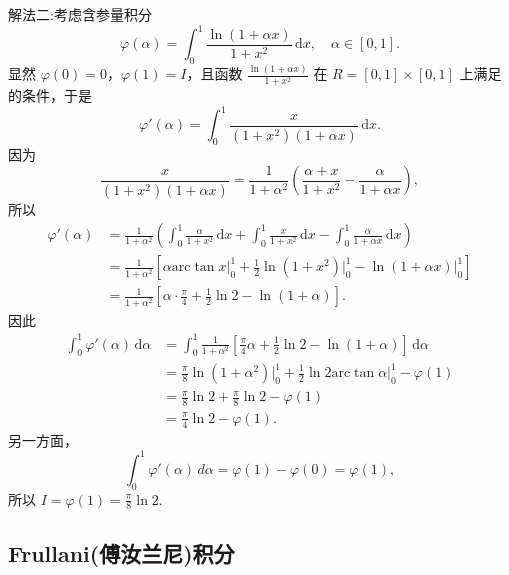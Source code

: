 \documentclass[../../main.tex]{subfiles}
\begin{document}
\begin{solution}
{\color{blue}解法二:}考虑含参量积分
\[
\varphi(\alpha) = \int_{0}^{1} \frac{\ln(1 + \alpha x)}{1 + x^2} \, \mathrm{d}x, \quad \alpha \in [0,1].
\]
显然 \( \varphi(0) = 0 \)，\( \varphi(1) = I \)，且函数 \( \frac{\ln(1 + \alpha x)}{1 + x^2} \) 在 \( R = [0,1] \times [0,1] \) 上满足 的条件，于是
\[
\varphi'(\alpha) = \int_{0}^{1} \frac{x}{(1 + x^2)(1 + \alpha x)} \, \mathrm{d}x.
\]
因为
\[
\frac{x}{(1 + x^2)(1 + \alpha x)} = \frac{1}{1 + \alpha^2} \left( \frac{\alpha + x}{1 + x^2} - \frac{\alpha}{1 + \alpha x} \right),
\]
所以
\begin{align*}
\varphi' \left( \alpha \right) &=\frac{1}{1+\alpha ^2}\left( \int_0^1{\frac{\alpha}{1+x^2}\,\mathrm{d}x}+\int_0^1{\frac{x}{1+x^2}\,\mathrm{d}x}-\int_0^1{\frac{\alpha}{1+\alpha x}\,\mathrm{d}x} \right) 
\\
&=\frac{1}{1+\alpha ^2}\left[ \alpha \mathrm{arc}\tan x\Big|_{0}^{1}+\frac{1}{2}\ln \left( 1+x^2 \right) \Big|_{0}^{1}-\ln \left( 1+\alpha x \right) \Big|_{0}^{1} \right] 
\\
&=\frac{1}{1+\alpha ^2}\left[ \alpha \cdot \frac{\pi}{4}+\frac{1}{2}\ln 2-\ln \left( 1+\alpha \right) \right] .
\end{align*}
因此
\begin{align*}
\int_0^1{\varphi' \left( \alpha \right) \,\mathrm{d}\alpha}&=\int_0^1{\frac{1}{1+\alpha ^2}\left[ \frac{\pi}{4}\alpha +\frac{1}{2}\ln 2-\ln \left( 1+\alpha \right) \right] \,\mathrm{d}\alpha}
\\
&=\frac{\pi}{8}\ln \left( 1+\alpha ^2 \right) \Big|_{0}^{1}+\frac{1}{2}\ln 2\mathrm{arc}\tan \alpha \Big|_{0}^{1}-\varphi \left( 1 \right) 
\\
&=\frac{\pi}{8}\ln 2+\frac{\pi}{8}\ln 2-\varphi \left( 1 \right) 
\\
&=\frac{\pi}{4}\ln 2-\varphi \left( 1 \right) .
\end{align*}
另一方面，
\[
\int_{0}^{1} \varphi'(\alpha) \, d\alpha = \varphi(1) - \varphi(0) = \varphi(1),
\]
所以 \( I = \varphi(1) = \frac{\pi}{8} \ln 2 \).
\end{solution}


\subsection{Frullani(傅汝兰尼)积分}
\end{document}
